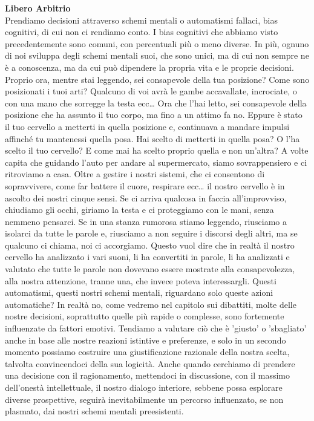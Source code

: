 \documentclass[12pt]{book} %
\begin{document}
\noindent \textbf{\large Libero Arbitrio} \\
Prendiamo decisioni attraverso schemi mentali o automatismi fallaci, bias cognitivi, di cui non ci rendiamo conto. I
bias cognitivi che abbiamo visto precedentemente sono comuni, con percentuali più o meno diverse. In più,
ognuno di noi sviluppa degli schemi mentali suoi, che sono unici, ma di cui non sempre ne è a conoscenza, ma da cui può
dipendere la propria vita e le proprie decisioni. Proprio ora, mentre stai leggendo, sei consapevole della tua
posizione? Come sono posizionati i tuoi arti? Qualcuno di voi avrà le gambe accavallate, incrociate, o con una mano che
sorregge la testa ecc… Ora che l'hai letto, sei consapevole della posizione che ha assunto il tuo
corpo, ma fino a un attimo fa no. Eppure è stato il tuo cervello a metterti in quella posizione e, continuava a mandare
impulsi affinché tu mantenessi quella posa. Hai scelto di metterti in quella posa? O l'ha scelto
il tuo cervello? E come mai ha scelto proprio quella e non un'altra? A volte capita che guidando
l'auto per andare al supermercato, siamo sovrappensiero e ci ritroviamo a casa. Oltre a gestire i nostri sistemi, che ci consentono di sopravvivere, come far battere il cuore, respirare ecc… il nostro cervello
è in ascolto dei nostri cinque sensi. Se ci arriva qualcosa in faccia all'improvviso,
chiudiamo gli occhi, giriamo la testa e ci proteggiamo con le mani, senza nemmeno pensarci. Se in una stanza rumorosa
stiamo leggendo, riusciamo a isolarci da tutte le parole e, riusciamo a non seguire i discorsi degli altri, ma se
qualcuno ci chiama, noi ci accorgiamo. Questo vuol dire che in realtà il nostro cervello ha analizzato i vari suoni,
li ha convertiti in parole, li ha analizzati e valutato che tutte le parole non dovevano essere mostrate
alla consapevolezza, alla nostra attenzione, tranne una, che invece poteva interessargli. Questi automatismi, questi
nostri schemi mentali, riguardano solo queste azioni automatiche? In realtà no, come vedremo nel capitolo sui
dibattiti, molte delle nostre decisioni, soprattutto quelle più rapide o complesse, sono fortemente influenzate da fattori emotivi. Tendiamo a valutare ciò che è 'giusto' o 'sbagliato' anche in base alle nostre reazioni istintive e preferenze, e solo in un secondo momento possiamo costruire una giustificazione razionale della nostra scelta, talvolta convincendoci della sua logicità.
Anche quando cerchiamo di prendere una decisione con il ragionamento, mettendoci in discussione, con il massimo
dell'onestà intellettuale, il nostro dialogo interiore, sebbene possa esplorare diverse prospettive, seguirà inevitabilmente un percorso influenzato, se non plasmato, dai nostri schemi mentali preesistenti.
\end{document}
